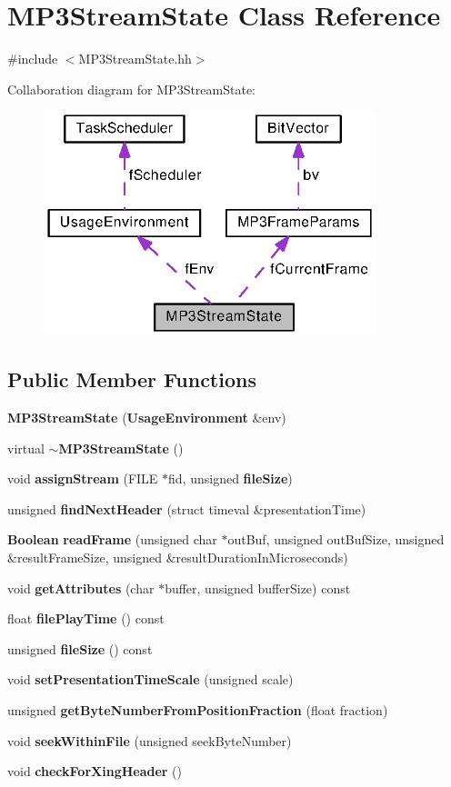\section{M\+P3\+Stream\+State Class Reference}
\label{classMP3StreamState}


{\ttfamily \#include $<$M\+P3\+Stream\+State.\+hh$>$}



Collaboration diagram for M\+P3\+Stream\+State\+:
\nopagebreak
\begin{figure}[H]
\begin{center}
\leavevmode
\includegraphics[width=274pt]{classMP3StreamState__coll__graph}
\end{center}
\end{figure}
\subsection*{Public Member Functions}
\begin{DoxyCompactItemize}
\item 
{\bf M\+P3\+Stream\+State} ({\bf Usage\+Environment} \&env)
\item 
virtual {\bf $\sim$\+M\+P3\+Stream\+State} ()
\item 
void {\bf assign\+Stream} (F\+I\+L\+E $\ast$fid, unsigned {\bf file\+Size})
\item 
unsigned {\bf find\+Next\+Header} (struct timeval \&presentation\+Time)
\item 
{\bf Boolean} {\bf read\+Frame} (unsigned char $\ast$out\+Buf, unsigned out\+Buf\+Size, unsigned \&result\+Frame\+Size, unsigned \&result\+Duration\+In\+Microseconds)
\item 
void {\bf get\+Attributes} (char $\ast$buffer, unsigned buffer\+Size) const 
\item 
float {\bf file\+Play\+Time} () const 
\item 
unsigned {\bf file\+Size} () const 
\item 
void {\bf set\+Presentation\+Time\+Scale} (unsigned scale)
\item 
unsigned {\bf get\+Byte\+Number\+From\+Position\+Fraction} (float fraction)
\item 
void {\bf seek\+Within\+File} (unsigned seek\+Byte\+Number)
\item 
void {\bf check\+For\+Xing\+Header} ()
\end{DoxyCompactItemize}
